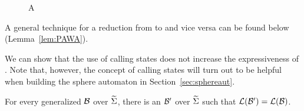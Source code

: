 \documentclass{LMCS}
\begin{document}
\begin{figure}[h]
  \centering
{}
\caption{A \tNWA \label{fig:mnwa}}
\end{figure}

A general technique for a reduction from \MVPA to \MNWA and vice versa can be
found below (Lemma~\ref{lem:PAWA}).

We can show that the use of calling states does not increase the
expressiveness of \MNWA. Note that, however, the concept of calling states
will turn out to be helpful when building the sphere automaton in
Section~\ref{sec:sphereaut}.

\begin{lem}\label{lem:generalized}
  For every generalized \MNWA $\mathcal{B}$ over $\widetilde{\Sigma}$, there is an \MNWA $\mathcal{B}'$
  over $\widetilde{\Sigma}$ such that $\mathcal{L}(\mathcal{B}') = \mathcal{L}(\mathcal{B})$.
\end{lem}
\end{document}

